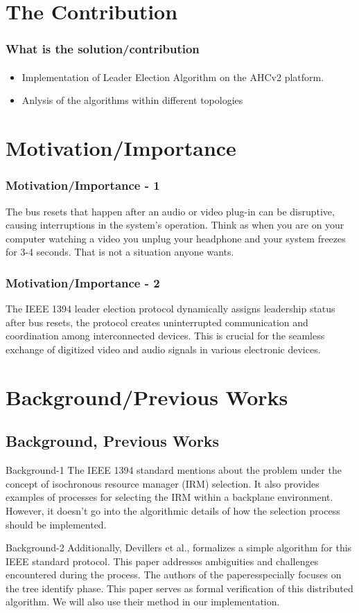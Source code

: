 \documentclass[11pt]{beamer}              %
\begin{document}
\section{The Contribution}
\begin{frame}
\frametitle{What is the solution/contribution}
    \framesubtitle{}
	\begin{itemize}
		\item Implementation of Leader Election Algorithm on the AHCv2 platform.
		\item Anlysis of the algorithms within different topologies
	\end{itemize}
\end{frame}


\section{Motivation/Importance}
\begin{frame}
\frametitle{Motivation/Importance - 1}
The bus resets that happen after an audio or video plug-in can be disruptive, causing interruptions in the system's operation. Think as when you are on your computer watching a video you unplug your headphone and your system freezes for 3-4 seconds. That is not a situation anyone wants. 
\end{frame}
\begin{frame}
\frametitle{Motivation/Importance - 2}
The IEEE 1394 leader election protocol dynamically assigns leadership status after bus resets, the protocol creates uninterrupted communication and coordination among interconnected devices. This is crucial for the seamless exchange of digitized video and audio signals in various electronic devices.
\end{frame}



\section{Background/Previous Works}

\subsection{Background, Previous Works}
\begin{frame}{Background-1}
	The IEEE 1394 standard mentions about the problem under the concept of isochronous resource manager (IRM) selection.
	It also provides examples of processes for selecting the IRM within a backplane environment.
	However, it doesn't go into the algorithmic details of how the selection process should be implemented.
\end{frame}
\begin{frame}{Background-2}
	Additionally, Devillers et al., formalizes a simple algorithm for this IEEE standard protocol.
	This paper addresses ambiguities and challenges encountered during the process.
	The authors of the paperesspecially focuses on the tree identify phase.
	This paper serves as formal verification of this distributed algorithm. We will also use their method in our implementation.
\end{frame}
\end{document}
